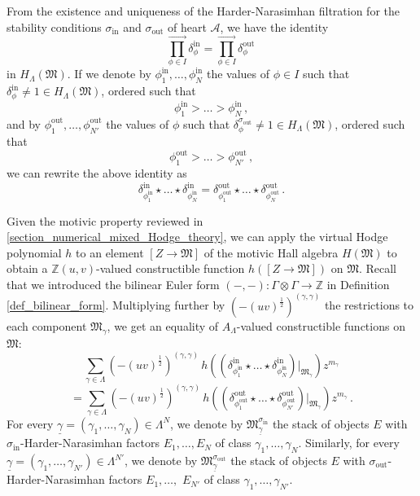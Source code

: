 \documentclass[12pt, a4paper]{amsart}
\newcommand\Z{\mathbb Z}
\newcommand\cA{\mathcal A}
\newcommand\fM{\mathfrak M}
\newcommand\iin{\mathrm{in}}
\newcommand\oout{\mathrm{out}}
\begin{document}
From the
existence and uniqueness of the Harder-Narasimhan filtration for the stability conditions $\sigma_\iin$ and $\sigma_\oout$ of heart $\cA$, we have the identity
\[ \prod_{\phi \in I}^{\rightarrow} \delta_{\phi}^{\iin}
=\prod_{\phi \in I}^{\rightarrow} \delta_{\phi}^{\oout}\,\]
in $H_\Lambda(\fM)$.
If we denote by $\phi_1^{\iin},\dots,
\phi_N^{\iin}$ the values of $\phi \in I$ such that $\delta_\phi^{\iin} \neq 1 \in H_\Lambda(\fM)$, ordered such that 
\[ \phi_1^{\iin}>\dots >\phi_N^{\iin}\,,\]
and by $\phi_1^{\oout},\dots,
\phi_{N'}^{\oout}$ the values of 
$\phi$ such that 
$\delta_\phi^{\sigma_\oout} \neq 1 \in H_\Lambda(\fM)$, ordered such that 
\[ \phi_1^{\oout}>\dots>\phi_{N'}^{\oout}\,,\]
we can rewrite the above identity as 
\[ \delta_{\phi_1^{\iin}}^{\iin}
\star \dots \star \delta_{\phi_N^{\iin}}^{\iin}
=\delta_{\phi_1^{\oout}}^{\oout}
\star \dots \star \delta_{\phi_N^{\oout}}^{\oout}\,.\]

Given the motivic property reviewed in
\cref{section_numerical_mixed_Hodge_theory}, we can apply the virtual Hodge polynomial $h$ to an element $[Z \rightarrow \fM]$ of the motivic Hall algebra $H(\fM)$ to obtain a 
$\Z(u,v)$-valued constructible function $h([Z \rightarrow \fM])$ on $\fM$.
Recall that we introduced the bilinear Euler form $(-,-) \colon \Gamma \otimes \Gamma \rightarrow \Z$ in Definition \ref{def_bilinear_form}.
Multiplying further by $(-(uv)^{\frac{1}{2}})^{(\gamma,\gamma)}$ the restrictions to each component $\fM_\gamma$, 
we get an equality of $A_\Lambda$-valued constructible functions on 
$\fM$:
\[ \sum_{\gamma \in \Lambda}
(-(uv)^{\frac{1}{2}})^{(\gamma,\gamma)}
\,h\left( (\delta_{\phi_1^{\iin}}^{\iin}
\star \dots \star \delta_{\phi_N^{\iin}}^{\iin})|_{\fM_\gamma}\right)z^{m_\gamma}\]
\[=\sum_{\gamma \in \Lambda}
(-(uv)^{\frac{1}{2}})^{(\gamma,\gamma)}\,
h\left( (\delta_{\phi_1^{\oout}}^{\oout}
\star \dots \star \delta_{\phi_{N'}^{\oout}}^{\oout})|_{\fM_\gamma}\right)z^{m_\gamma}\,.
\]
For every $\underline{\gamma}
=(\gamma_1,\dots,\gamma_N) \in \Lambda^N$, we denote by
$\fM_{\underline{\gamma}}^{\sigma_\iin}$
the stack of objects $E$ with 
$\sigma_\iin$-Harder-Narasimhan factors
$E_1,\dots,E_N$ 
of class $\gamma_1,\dots,\gamma_N$.
Similarly, for every $\underline{\gamma}
=(\gamma_1,\dots,\gamma_{N'}) \in \Lambda^{N'}$, we denote by
$\fM_{\underline{\gamma}}^{\sigma_\oout}$
the stack of objects $E$ with 
$\sigma_\oout$-Harder-Narasimhan factors
$E_1,\dots,$ $E_{N'}$ 
of class $\gamma_1,\dots,\gamma_{N'}$.
\end{document}
